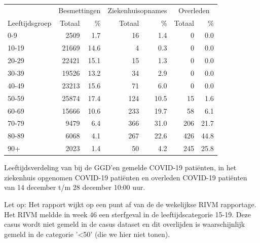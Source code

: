 \documentclass[
  english,
  man,floatsintext]{apa6}
\begin{document}
\begin{table}[H]
\centering\begingroup\fontsize{11}{13}\selectfont

\begin{threeparttable}
\begin{tabular}{lrrrrrr}
\toprule
\multicolumn{1}{c}{ } & \multicolumn{2}{c}{Besmettingen} & \multicolumn{2}{c}{Ziekenhuisopnames} & \multicolumn{2}{c}{Overleden} \\
\cmidrule(l{3pt}r{3pt}){2-3} \cmidrule(l{3pt}r{3pt}){4-5} \cmidrule(l{3pt}r{3pt}){6-7}
Leeftijdsgroep & Totaal & \% & Totaal & \% & Totaal & \%\\
\midrule
0-9 & 2509 & 1.7 & 16 & 1.4 & 0 & 0.0\\
10-19 & 21669 & 14.6 & 4 & 0.3 & 0 & 0.0\\
20-29 & 22421 & 15.1 & 15 & 1.3 & 0 & 0.0\\
30-39 & 19526 & 13.2 & 34 & 2.9 & 0 & 0.0\\
40-49 & 23213 & 15.6 & 71 & 6.0 & 0 & 0.0\\
50-59 & 25874 & 17.4 & 124 & 10.5 & 15 & 1.6\\
60-69 & 15666 & 10.6 & 233 & 19.7 & 58 & 6.1\\
70-79 & 9479 & 6.4 & 366 & 31.0 & 206 & 21.7\\
80-89 & 6068 & 4.1 & 267 & 22.6 & 426 & 44.8\\
90+ & 2023 & 1.4 & 50 & 4.2 & 245 & 25.8\\
\bottomrule
\end{tabular}
\begin{tablenotes}
\item[1] Leeftijdsverdeling van bij de GGD’en gemelde COVID-19 patiënten, in het ziekenhuis opgenomen COVID-19 patiënten en overleden COVID-19 patiënten van 14 december t/m 28 december 10:00 uur.
\item[2] Let op: Het rapport wijkt op een punt af van de de wekelijkse RIVM rapportage. Het RIVM meldde in week 46 een sterfgeval in de leeftijdscategorie 15-19. Deze casus wordt niet gemeld in de casus dataset en dit overlijden is waarschijnlijk gemeld in de categorie '<50' (die we hier niet tonen).
\end{tablenotes}
\end{threeparttable}
\endgroup{}
\end{table}

\newpage
\end{document}
